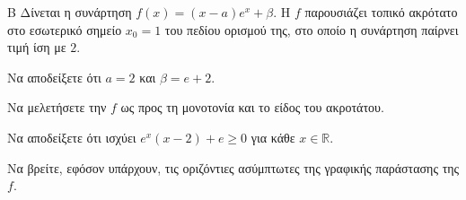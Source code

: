 \begin{thema}{Β}
Δίνεται η συνάρτηση $f(x) = (x-a)e^x + \beta$. Η $f$ παρουσιάζει τοπικό ακρότατο στο εσωτερικό σημείο $x_0=1$ του πεδίου ορισμού της, στο οποίο η συνάρτηση παίρνει τιμή ίση με $2$.
\begin{erwthma}
  \item Να αποδείξετε ότι $a=2$ και $\beta = e+2$.
  \item Να μελετήσετε την $f$ ως προς τη μονοτονία και το είδος του ακροτάτου.
  \item Να αποδείξετε ότι ισχύει $e^x(x-2)+e \ge 0$ για κάθε $x \in \mathbb{R}$.
  \item Να βρείτε, εφόσον υπάρχουν, τις οριζόντιες ασύμπτωτες της γραφικής παράστασης της $f$.
\end{erwthma}
\end{thema}
